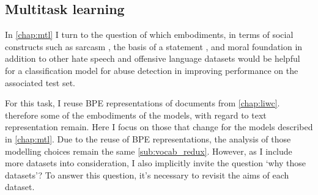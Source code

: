 \subsection{Multitask learning}\label{sub:mtl_inchap}

In \autoref{chap:mtl} I turn to the question of which embodiments, in terms of social constructs such as sarcasm \citep{Oraby_sarcasm:2016}, the basis of a statement \citep{Oraby_factfeel:2015}, and moral foundation \citep{Hoover:2019} in addition to other hate speech and offensive language datasets \citep{Waseem:2016,Waseem-Hovy:2016,Davidson:2017,Wulczyn:2016} would be helpful for a classification model for abuse detection in improving performance on the associated test set.

For this task,  I reuse BPE representations of documents from \autoref{chap:liwc}. therefore some of the embodiments of the models, with regard to text representation remain. Here I focus on those that change for the models described in \autoref{chap:mtl}. Due to the reuse of BPE representations, the analysis of those modelling choices remain the same \autoref{sub:vocab_redux}. However, as I include more datasets into consideration, I also implicitly invite the question `why those datasets'? To answer this question, it's necessary to revisit the aims of each dataset.

